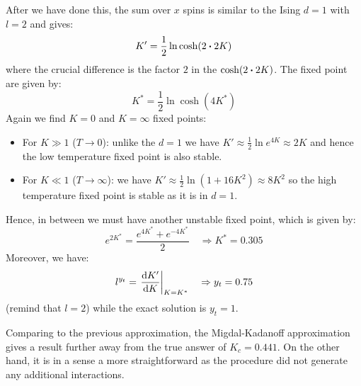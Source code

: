 \documentclass[../main/main.tex]{subfiles}
\begin{document}
After we have done this, the sum over \( x \) spins is similar to the Ising \( d=1 \) with \( l=2 \) and gives:
\begin{equation*}
  K' = \frac{1}{2} \ln \cosh (2 \vdot 2K)
\end{equation*}
where the crucial difference is the factor \( 2 \) in the \(\cosh (2 \vdot 2K)  \).
 The fixed point are given by:
\begin{equation*}
  K^* = \frac{1}{2} \ln \cosh (4 K^*)
\end{equation*}
Again we find \( K=0 \) and \( K= \infty  \)  fixed points:
\begin{itemize}
\item For \( K \gg 1 \) (\( T \rightarrow 0 \)):  unlike the \( d=1 \) we have \( K' \approx \frac{1}{2} \ln e^{4K} \approx 2K \) and hence the low temperature fixed point is also stable.
\item For \( K \ll 1 \) (\( T \rightarrow \infty  \)): we have \( K' \approx \frac{1}{2} \ln (1+16K^2) \approx 8K^2 \) so the high temperature fixed point is stable as it is in \( d=1 \).
\end{itemize}
Hence, in between we must have another unstable fixed point, which is given by:
\begin{equation*}
  e^{2K^*} = \frac{e^{4K^*} + e^{-4K^*}}{2} \quad \Rightarrow K^* = 0.305
\end{equation*}
Moreover, we have:
\begin{equation*}
  l^{y_t} = \eval{\dv{K'}{K} }_{K=K^*} \quad \Rightarrow y_t = 0.75
\end{equation*}
(remind that \( l=2 \)) while the exact solution is \( y_t = 1 \).

Comparing to the previous approximation, the Migdal-Kadanoff approximation gives a result further away from the true answer of \( K_c = 0.441 \). On the other hand, it is in a sense a more straightforward as the procedure did not generate any additional interactions.
\end{document}
